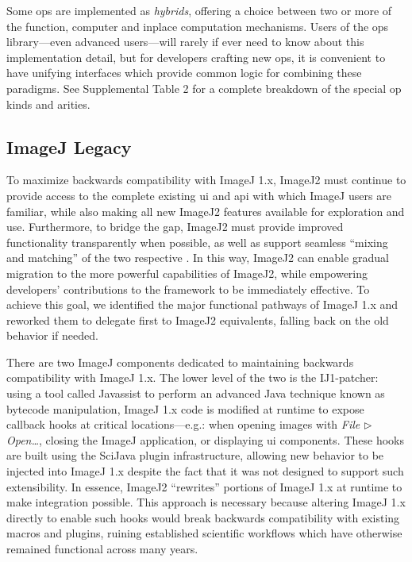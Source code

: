 \documentclass{bmcart}
\begin{document}
Some ops are implemented as \textit{hybrids}, offering a choice between two or
more of the function, computer and inplace computation mechanisms. Users of the
ops library---even advanced users---will rarely if ever need to know about this
implementation detail, but for developers crafting new ops, it is convenient to
have unifying interfaces which provide common logic for combining these
paradigms. See Supplemental Table 2 for a complete breakdown of the special op
kinds and arities.

\subsection*{ImageJ Legacy}
To maximize backwards compatibility with ImageJ 1.x, ImageJ2 must continue to
provide access to the complete existing \acrshort{ui} and \acrshort{api} with
which ImageJ users are familiar, while also making all new ImageJ2 features
available for exploration and use. Furthermore, to bridge the gap, ImageJ2 must
provide improved functionality transparently when possible, as well as support
seamless ``mixing and matching'' of the two respective . In
this way, ImageJ2 can enable gradual migration to the more powerful
capabilities of ImageJ2, while empowering developers' contributions to the
framework to be immediately effective. To achieve this goal, we identified the
major functional pathways of ImageJ 1.x and reworked them to delegate first to
ImageJ2 equivalents, falling back on the old behavior if needed.

There are two ImageJ components dedicated to maintaining backwards
compatibility with ImageJ 1.x. The lower level of the two is the IJ1-patcher:
using a tool called Javassist \cite{javassist} to perform an advanced Java
technique known as bytecode manipulation, ImageJ 1.x code is modified at
runtime to expose callback hooks at critical locations---e.g.: when opening
images with \textit{File $\triangleright$ Open\ldots}, closing the ImageJ
application, or displaying \acrshort{ui} components. These hooks are built
using the SciJava plugin infrastructure, allowing new behavior to be injected
into ImageJ 1.x despite the fact that it was not designed to support such
extensibility. In essence, ImageJ2 ``rewrites'' portions of ImageJ 1.x at
runtime to make integration possible. This approach is necessary because
altering ImageJ 1.x directly to enable such hooks would break backwards
compatibility with existing macros and plugins, ruining established scientific
workflows which have otherwise remained functional across many years.
\end{document}
